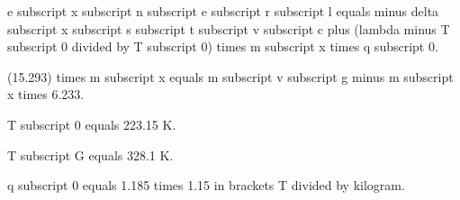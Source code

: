 e subscript x subscript n subscript e subscript r subscript l equals minus delta subscript x subscript s subscript t subscript v subscript c plus (lambda minus T subscript 0 divided by T subscript 0) times m subscript x times q subscript 0.

(15.293) times m subscript x equals m subscript v subscript g minus m subscript x times 6.233.

T subscript 0 equals 223.15 K.

T subscript G equals 328.1 K.

q subscript 0 equals 1.185 times 1.15 in brackets T divided by kilogram.